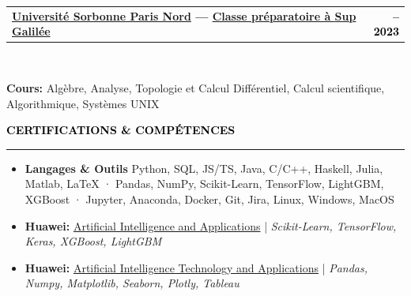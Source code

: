 \documentclass[10pt,english,french]{article}
\makeatletter
\newcommand{\certificateIcon}[1][black]{\textcolor{#1}{\faClipboard}}
\newlength{\mpwidth}
\newcommand{\cvsection}[1]{
    \vspace{4pt}
    \textbf{\fontsize{9pt}{10pt}\selectfont \textcolor{black}{#1}}
    \vspace{6pt}
    \hrule
    \vspace{6pt}
}
\newcommand{\cvtextnotab}[1]{
    \parbox{1\mpwidth}{#1}
}
\newcommand{\cvevent}[2]{
    \vspace{2pt}
    \parbox{\mpwidth}{
        \begin{tabular*}{1\mpwidth}{@{\extracolsep{\fill}} l r}
            \textcolor{black}{\textbf{\fontsize{11}{12}\selectfont #1}} & \textcolor{black}{\textbf{\fontsize{12}{12}\selectfont #2}} \\
        \end{tabular*}\\[-8pt] %
    }
}
\newcommand{\cvsubevent}[2]{
    \parbox{\mpwidth}{
        \begin{tabular*}{1\mpwidth}{@{\extracolsep{\fill}} l r}
            \textcolor{black}{\textit{\fontsize{10}{12}\selectfont #1}} & \textcolor{black}{\textit{\fontsize{10}{12}\selectfont #2}} \\
        \end{tabular*}\\[-8pt] %
    }
    \vspace{-10pt}
}
\makeatother
\begin{document}
\cvevent{\href{https://www.univ-spn.fr}{Université Sorbonne Paris Nord} --- \href{https://www.sup-galilee.univ-paris13.fr/index.php/formation/cp2i/}{Classe préparatoire à \textbf{Sup Galilée}}}{\fontsize{11pt}{11pt}\selectfont 2021\hspace{5pt}--\hspace{5pt}2023}

\vspace{-10pt}
\cvtextnotab{\textbf{Cours\!:} Algèbre, Analyse, Topologie et Calcul Différentiel, Calcul scientifique, Algorithmique, Systèmes UNIX}



\vspace{-14pt}
\cvsection{\certificateIcon[black]\hspace{4pt}CERTIFICATIONS \& COMPÉTENCES}

\vspace{-4pt}
\begin{itemize}[leftmargin=0.5cm, label=\textbullet, itemsep=0.2em]
    \item \textbf{Langages \& Outils} Python, SQL, JS/TS, Java, C/C++, Haskell, Julia, Matlab, LaTeX · Pandas, NumPy, Scikit-Learn, TensorFlow, LightGBM, XGBoost · Jupyter, Anaconda, Docker, Git, Jira, Linux, Windows, MacOS
    \item \textbf{Huawei:} \href{https://github.com/DmytroPalahin/cv-latex-simple-en/blob/main/docs/huawei_artificial_intelligence_and_applications.pdf}{Artificial Intelligence and Applications} | \textit{Scikit-Learn, TensorFlow, Keras, XGBoost, LightGBM}
    \item \textbf{Huawei:} \href{https://github.com/DmytroPalahin/cv-latex-simple-en/blob/main/docs/huawei_artificial_intelligence_technology_and_applications.pdf}{Artificial Intelligence Technology and Applications} | \textit{Pandas, Numpy, Matplotlib, Seaborn, Plotly, Tableau}
\end{itemize}
\end{document}
